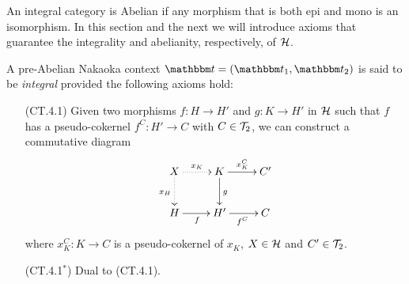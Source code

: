 An integral category is Abelian if any morphism that is both epi and mono is an isomorphism. In this section and the next we will introduce axioms that guarantee the integrality and abelianity, respectively, of $\mathcal{H}$.

\begin{definition}
A pre-Abelian Nakaoka context $\t=(\t_1,\t_2)$ is said to be \emph{integral} provided the following axioms hold:
\begin{enumerate}
\item[(CT.4.1)] Given two morphisms $f\colon H\to H'$ and $g\colon K\to H'$ in $\mathcal{H}$ such that $f$ has a pseudo-cokernel $f^C\colon H'\to C$ with $C\in \mathcal{T}_2$, we can construct a commutative diagram
\[
\xymatrix{
X\ar@{.>}[d]_{x_H}\ar@{.>}[r]^{x_K}&K\ar[r]^{x_K^C}\ar[d]^{g}&C'\\
H\ar[r]_f&H'\ar[r]_{f^C}&C
}
\]
where $x_K^C\colon K\to C$ is a pseudo-cokernel of $x_K$, $X\in \mathcal{H}$ and $C'\in \mathcal{T}_2$.
\item[(CT.4.1$^*$)]  Dual to (CT.4.1).
\end{enumerate}
\end{definition}

